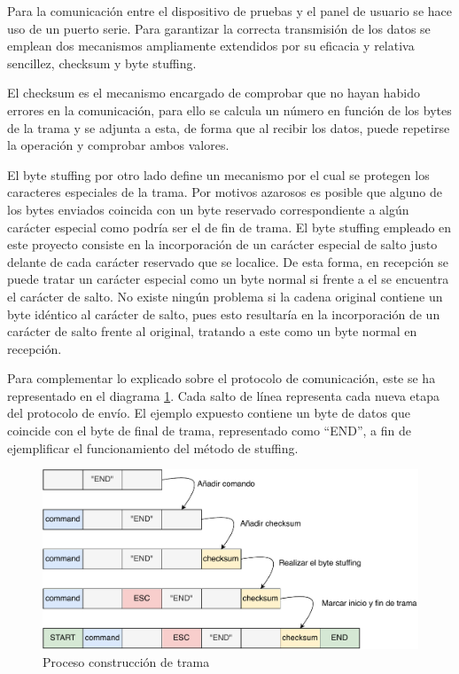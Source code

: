         Para la comunicación entre el dispositivo de pruebas y el panel de usuario se hace uso de un puerto serie. Para garantizar la correcta transmisión de los datos se emplean dos mecanismos ampliamente extendidos por su eficacia y relativa sencillez, checksum y byte stuffing. 
        
        El checksum es el mecanismo encargado de comprobar que no hayan habido errores en la comunicación, para ello se calcula un número en función de los bytes de la trama y se adjunta a esta, de forma que al recibir los datos, puede repetirse la operación y comprobar ambos valores. 
        
        El byte stuffing por otro lado define un mecanismo por el cual se protegen los caracteres especiales de la trama. Por motivos azarosos es posible que alguno de los bytes enviados coincida con un byte reservado correspondiente a algún carácter especial  como podría ser el de fin de trama. El byte stuffing empleado en este proyecto consiste en la incorporación de un carácter especial de salto justo delante de cada carácter reservado que se localice. De esta forma, en recepción se puede tratar un carácter especial como un byte normal si frente a el se encuentra el carácter de salto. No existe ningún problema si la cadena original contiene un byte idéntico al carácter de salto, pues esto resultaría en la incorporación de un carácter de salto frente al original, tratando a este como un byte normal en recepción.
        
        Para complementar lo explicado sobre el protocolo de comunicación, este se ha representado en el diagrama \ref{fig:frame}. Cada salto de línea representa cada nueva etapa del protocolo de envío. El ejemplo expuesto contiene un byte de datos que coincide con el byte de final de trama, representado como “END”, a fin de ejemplificar el funcionamiento del método de stuffing.

        \begin{figure}[H]
                \centering
                        \includegraphics[width = \linewidth]{figuras/ProtocoloCom.pdf}
                \caption{Proceso construcción de trama}
                \label{fig:frame}
        \end{figure}

